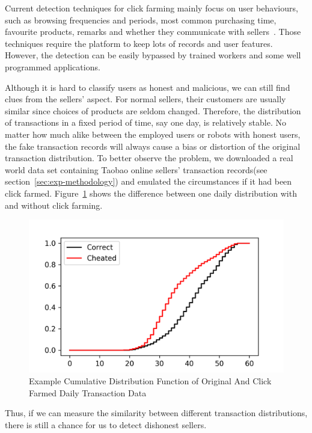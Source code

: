 \documentclass[a4paper]{IEEEtran}
\begin{document}
			Current detection techniques for click farming mainly focus on user behaviours, such as browsing frequencies and periods, most common purchasing time, favourite products, remarks and whether they communicate with sellers~\cite{simpleDetection}. Those techniques require the platform to keep lots of records and user features. However, the detection can be easily bypassed by trained workers and some well programmed applications.
			
			Although it is hard to classify users as honest and malicious, we can still find clues from the sellers' aspect. For normal sellers, their customers are usually similar since choices of products are seldom changed. Therefore, the distribution of transactions in a fixed period of time, say one day, is relatively stable. No matter how much alike between the employed users or robots with honest users, the fake transaction records will always cause a bias or distortion of the original transaction distribution. To better observe the problem, we downloaded a real world data set containing Taobao online sellers' transaction records(see section~\ref{sec:exp-methodology}) and emulated the circumstances if it had been click farmed. Figure~\ref{fig:example-ecdf} shows the difference between one daily distribution with and without click farming.
			
			\begin{figure}[!t]
				\centering
				\includegraphics[width=\linewidth]{fig/ExampleEcdf.png}
				\caption{Example Cumulative Distribution Function of Original And Click Farmed Daily Transaction Data}
				\label{fig:example-ecdf}
			\end{figure}
			
			Thus, if we can measure the similarity between different transaction distributions, there is still a chance for us to detect dishonest sellers.
			
\end{document}
